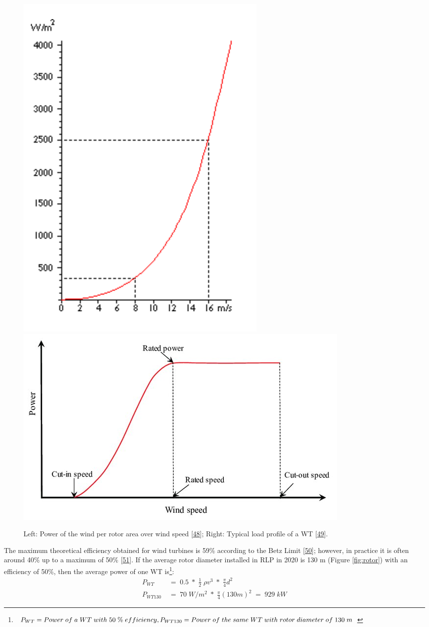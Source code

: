 \documentclass[a4paper,11pt]{article}
\begin{document}
\begin{figure}

{\centering \includegraphics[width=0.49\linewidth,height=0.25\textheight]{figures/power2} \includegraphics[width=0.49\linewidth,height=0.25\textheight]{figures/Typical-wind-power-output-versus-wind-speed_W640} 

}

\caption{Left: Power of the wind per rotor area over wind speed {[}\protect\hyperlink{ref-DanishWindIndutryAssociation.2003}{48}{]}; Right: Typical load profile of a WT {[}\protect\hyperlink{ref-Rehman.2018}{49}{]}.}\label{fig:powerofwind}
\end{figure}
The maximum theoretical efficiency obtained for wind turbines is 59\% according to the Betz Limit {[}\protect\hyperlink{ref-A.Betz.1920}{50}{]}; however, in practice it is often around 40\% up to a maximum of 50\% {[}\protect\hyperlink{ref-WindwartsEnergieausdemNorden.2021}{51}{]}. If the average rotor diameter installed in RLP in 2020 is 130 m (Figure \ref{fig:rotor}) with an efficiency of 50\%, then the average power of one WT is\footnote{\(P_{WT}=Power\; of\; a\; WT\; with\; 50\; \%\; efficiency,\;\\ P_{WT130}=Power\; of\; the\; same\; WT\; with\; rotor\; diameter\; of\; 130\; m\)}:
\begin{equation}
\begin{split}
P_{WT}\; & =\; 0.5\; *\; \frac{1}{2}\; \rho v^3\; *\; \frac{\pi}{4}d^2 \\
P_{WT130}\; & =\; 70\; W/m^2\; *\; \frac{\pi}{4}(130 m)^2\; =\; 929\; kW
\end{split}
\end{equation}
\end{document}
